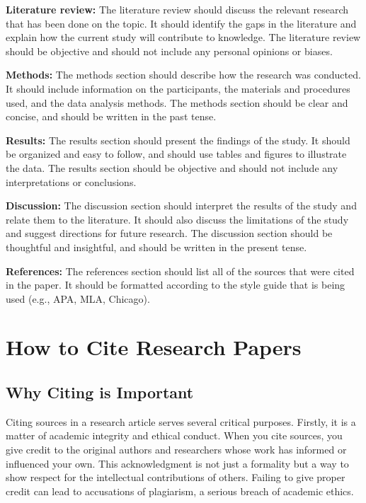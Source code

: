 \documentclass[
  b5paper]{book}
\begin{document}
\textbf{Literature review:} The literature review should discuss the relevant research that has been done on the topic. It should identify the gaps in the literature and explain how the current study will contribute to knowledge. The literature review should be objective and should not include any personal opinions or biases.

\textbf{Methods:} The methods section should describe how the research was conducted. It should include information on the participants, the materials and procedures used, and the data analysis methods. The methods section should be clear and concise, and should be written in the past tense.

\textbf{Results:} The results section should present the findings of the study. It should be organized and easy to follow, and should use tables and figures to illustrate the data. The results section should be objective and should not include any interpretations or conclusions.

\textbf{Discussion:} The discussion section should interpret the results of the study and relate them to the literature. It should also discuss the limitations of the study and suggest directions for future research. The discussion section should be thoughtful and insightful, and should be written in the present tense.

\textbf{References:} The references section should list all of the sources that were cited in the paper. It should be formatted according to the style guide that is being used (e.g., APA, MLA, Chicago).

\hypertarget{cite}{%
\section{How to Cite Research Papers}\label{cite}}

\hypertarget{why-citing-is-important}{%
\subsection{Why Citing is Important}\label{why-citing-is-important}}

Citing sources in a research article serves several critical purposes. Firstly, it is a matter of academic integrity and ethical conduct. When you cite sources, you give credit to the original authors and researchers whose work has informed or influenced your own. This acknowledgment is not just a formality but a way to show respect for the intellectual contributions of others. Failing to give proper credit can lead to accusations of plagiarism, a serious breach of academic ethics.
\end{document}
